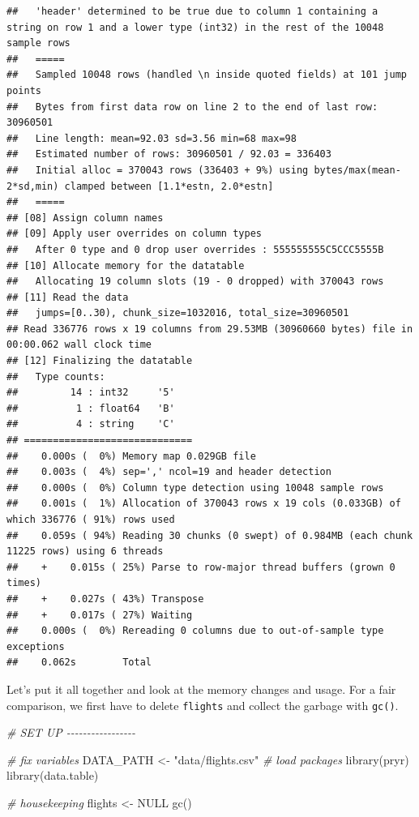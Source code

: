 \documentclass[
  12pt,
]{style/krantz}
\newenvironment{Shaded}{\begin{snugshade}}{\end{snugshade}}
\newcommand{\CommentTok}[1]{\textcolor[rgb]{0.56,0.35,0.01}{\textit{#1}}}
\newcommand{\ConstantTok}[1]{\textcolor[rgb]{0.00,0.00,0.00}{#1}}
\newcommand{\FunctionTok}[1]{\textcolor[rgb]{0.00,0.00,0.00}{#1}}
\newcommand{\NormalTok}[1]{#1}
\newcommand{\OtherTok}[1]{\textcolor[rgb]{0.56,0.35,0.01}{#1}}
\newcommand{\StringTok}[1]{\textcolor[rgb]{0.31,0.60,0.02}{#1}}
\begin{document}
\begin{verbatim}
##   'header' determined to be true due to column 1 containing a string on row 1 and a lower type (int32) in the rest of the 10048 sample rows
##   =====
##   Sampled 10048 rows (handled \n inside quoted fields) at 101 jump points
##   Bytes from first data row on line 2 to the end of last row: 30960501
##   Line length: mean=92.03 sd=3.56 min=68 max=98
##   Estimated number of rows: 30960501 / 92.03 = 336403
##   Initial alloc = 370043 rows (336403 + 9%) using bytes/max(mean-2*sd,min) clamped between [1.1*estn, 2.0*estn]
##   =====
## [08] Assign column names
## [09] Apply user overrides on column types
##   After 0 type and 0 drop user overrides : 555555555C5CCC5555B
## [10] Allocate memory for the datatable
##   Allocating 19 column slots (19 - 0 dropped) with 370043 rows
## [11] Read the data
##   jumps=[0..30), chunk_size=1032016, total_size=30960501
## Read 336776 rows x 19 columns from 29.53MB (30960660 bytes) file in 00:00.062 wall clock time
## [12] Finalizing the datatable
##   Type counts:
##         14 : int32     '5'
##          1 : float64   'B'
##          4 : string    'C'
## =============================
##    0.000s (  0%) Memory map 0.029GB file
##    0.003s (  4%) sep=',' ncol=19 and header detection
##    0.000s (  0%) Column type detection using 10048 sample rows
##    0.001s (  1%) Allocation of 370043 rows x 19 cols (0.033GB) of which 336776 ( 91%) rows used
##    0.059s ( 94%) Reading 30 chunks (0 swept) of 0.984MB (each chunk 11225 rows) using 6 threads
##    +    0.015s ( 25%) Parse to row-major thread buffers (grown 0 times)
##    +    0.027s ( 43%) Transpose
##    +    0.017s ( 27%) Waiting
##    0.000s (  0%) Rereading 0 columns due to out-of-sample type exceptions
##    0.062s        Total
\end{verbatim}

Let's put it all together and look at the memory changes and usage. For a fair comparison, we first have to delete \texttt{flights} and collect the garbage with \texttt{gc()}.

\begin{Shaded}
\begin{Highlighting}[]
\CommentTok{\# SET UP {-}{-}{-}{-}{-}{-}{-}{-}{-}{-}{-}{-}{-}{-}{-}{-}{-}}

\CommentTok{\# fix variables}
\NormalTok{DATA\_PATH }\OtherTok{\textless{}{-}} \StringTok{"data/flights.csv"}
\CommentTok{\# load packages}
\FunctionTok{library}\NormalTok{(pryr) }
\FunctionTok{library}\NormalTok{(data.table)}

\CommentTok{\# housekeeping}
\NormalTok{flights }\OtherTok{\textless{}{-}} \ConstantTok{NULL}
\FunctionTok{gc}\NormalTok{()}
\end{Highlighting}
\end{Shaded}
\end{document}

